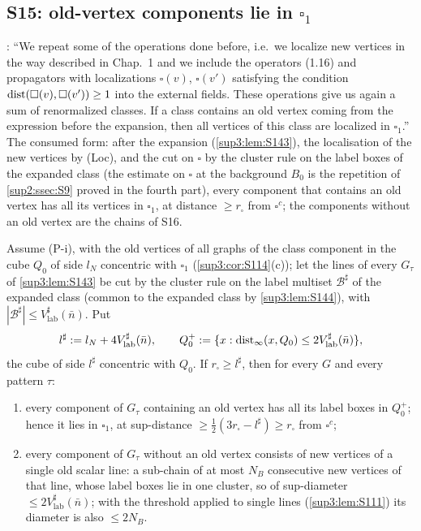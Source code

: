 
\subsection{S15: old-vertex components lie in $\square_1$}\label{sup3:ssec:S15}

\cite[p.~433]{Ba3}: ``We repeat some of the operations done before, i.e.\ we localize new vertices in the way described in Chap.~1 and we include the operators (1.16) and propagators with localizations $\square(v)$, $\square(v')$ satisfying the condition $\operatorname{dist}(\square(v),\square(v'))\ge1$ into the external fields. These operations give us again a sum of renormalized classes. If a class contains an old vertex coming from the expression before the expansion, then all vertices of this class are localized in $\square_1$.'' The consumed form: after the expansion (\cref{sup3:lem:S143}), the localisation of the new vertices by (Loc), and the cut on $\square$ by the cluster rule on the label boxes of the expanded class (the estimate \cite[(3.1)]{Ba3} on $\square$ at the background $B_0$ is the repetition of \cref{sup2:ssec:S9} proved in the fourth part), every component that contains an old vertex has all its vertices in $\square_1$, at distance $\ge r_\square$ from $\square^c$; the components without an old vertex are the chains of S16.

\begin{lemma}\label{sup3:lem:S15}
Assume (P-i), with the old vertices of all graphs of the class component in the cube $Q_0$ of side $l_N$ concentric with $\square_1$ (\cref{sup3:cor:S114}(c)); let the lines of every $G_\tau$ of \cref{sup3:lem:S143} be cut by the cluster rule on the label multiset $\mathcal B^\sharp$ of the expanded class (common to the expanded class by \cref{sup3:lem:S144}), with $|\mathcal B^\sharp|\le V^\sharp_{\mathrm{lab}}(\bar n)$. Put
\[
l^\sharp:= l_N+4V^\sharp_{\mathrm{lab}}(\bar n),\qquad Q_0^+:=\{x:\operatorname{dist}_\infty(x,Q_0)\le2V^\sharp_{\mathrm{lab}}(\bar n)\},
\]
the cube of side $l^\sharp$ concentric with $Q_0$. If $r_\square\ge l^\sharp$, then for every $G$ and every pattern $\tau$:
\begin{enumerate}[label=\textup{(\alph*)},nosep,leftmargin=*]
\item every component of $G_\tau$ containing an old vertex has all its label boxes in $Q_0^+$; hence it lies in $\square_1$, at sup-distance $\ge\frac12(3r_\square-l^\sharp)\ge r_\square$ from $\square^c$;
\item every component of $G_\tau$ without an old vertex consists of new vertices of a single old scalar line: a sub-chain of at most $N_B$ consecutive new vertices of that line, whose label boxes lie in one cluster, so of sup-diameter $\le2V^\sharp_{\mathrm{lab}}(\bar n)$; with the threshold applied to single lines (\cref{sup3:lem:S111}) its diameter is also $\le2N_B$.
\end{enumerate}
\end{lemma}

